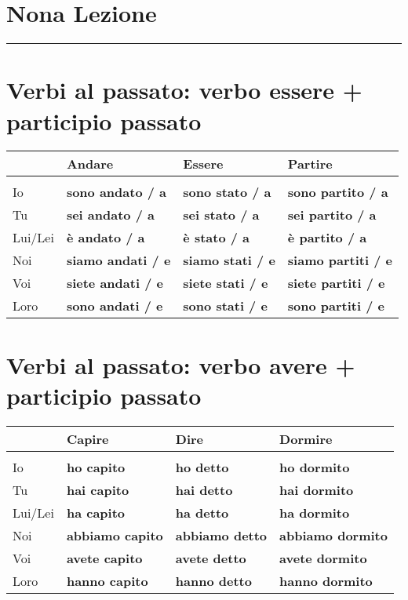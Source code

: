 \documentclass[letter,11pt]{article}
\begin{document}
\section*{\Large{Nona Lezione}}
\noindent\rule{16cm}{1pt}

\setlength{\parindent}{260pt}

\vskip 0.2in
\section*{Verbi al passato: verbo essere + participio passato}
\vskip 0.2in

\begin{tabular}{ |p{2cm}| p{3.5cm}| p{3.5cm}| p{3.5cm}| }
      & Andare & Essere & Partire  \\
    \hline
    \hline
     &  &  &  \\ \hline
    Io      & {\bf sono andato / a} & {\bf sono stato / a} & {\bf sono partito / a}  \\ \hline
    Tu      & {\bf sei andato / a} & {\bf sei stato / a} & {\bf sei partito / a}   \\ \hline
    Lui/Lei & {\bf è andato / a} & {\bf è stato / a} & {\bf è partito / a}    \\ \hline
    Noi     & {\bf siamo andati / e} & {\bf siamo stati / e} & {\bf siamo partiti / e} \\ \hline
    Voi     & {\bf siete andati / e} & {\bf siete stati / e} & {\bf siete partiti / e} \\ \hline
    Loro    & {\bf sono andati / e} & {\bf sono stati / e} & {\bf sono partiti / e}\\ \hline
    \hline
\end{tabular}

\vskip 0.2in
\section*{Verbi al passato: verbo avere + participio passato}
\vskip 0.2in

\begin{tabular}{ |p{2cm}| p{3.5cm}| p{3.5cm}| p{3.5cm}| }
      & Capire  & Dire & Dormire  \\
    \hline
    \hline
     &  &  & \\ \hline
    Io      & {\bf ho capito}      & {\bf ho detto}     &  {\bf ho dormito} \\ \hline
    Tu      & {\bf hai capito}     & {\bf hai detto}  &  {\bf hai dormito}  \\ \hline
    Lui/Lei & {\bf ha capito}      & {\bf ha detto}   &  {\bf ha dormito}\\ \hline
    Noi     & {\bf abbiamo capito} & {\bf abbiamo detto} & {\bf abbiamo dormito} \\ \hline
    Voi     & {\bf avete capito}   & {\bf avete detto}   &  {\bf avete dormito}  \\ \hline
    Loro    & {\bf hanno capito}   & {\bf hanno detto}   &  {\bf hanno dormito}  \\ \hline
    \hline
\end{tabular}
\end{document}
